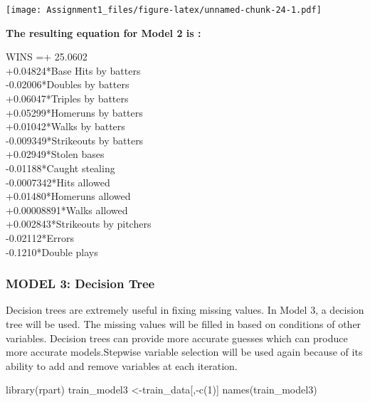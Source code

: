 \documentclass[
]{article}
\newenvironment{Shaded}{\begin{snugshade}}{\end{snugshade}}
\newcommand{\DecValTok}[1]{\textcolor[rgb]{0.00,0.00,0.81}{#1}}
\newcommand{\FunctionTok}[1]{\textcolor[rgb]{0.00,0.00,0.00}{#1}}
\newcommand{\NormalTok}[1]{#1}
\newcommand{\OtherTok}[1]{\textcolor[rgb]{0.56,0.35,0.01}{#1}}
\newcommand{\SpecialCharTok}[1]{\textcolor[rgb]{0.00,0.00,0.00}{#1}}
\begin{document}
\texttt{[image: Assignment1\_files/figure-latex/unnamed-chunk-24-1.pdf]}

\textbf{The resulting equation for Model 2 is :}

\begin{center}

WINS =+ 25.0602 \\
      +0.04824*Base Hits by batters \\
      -0.02006*Doubles by batters \\
      +0.06047*Triples by batters \\
      +0.05299*Homeruns by batters \\
      +0.01042*Walks by batters \\
      -0.009349*Strikeouts by batters \\
      +0.02949*Stolen bases \\
      -0.01188*Caught stealing \\
      -0.0007342*Hits allowed \\
      +0.01480*Homeruns allowed \\
      +0.00008891*Walks allowed \\
      +0.002843*Strikeouts by pitchers \\
      -0.02112*Errors \\
      -0.1210*Double plays \\
\end{center}

\hypertarget{model-3-decision-tree}{%
\subsubsection{MODEL 3: Decision Tree}\label{model-3-decision-tree}}

Decision trees are extremely useful in fixing missing values. In Model
3, a decision tree will be used. The missing values will be filled in
based on conditions of other variables. Decision trees can provide more
accurate guesses which can produce more accurate models.Stepwise
variable selection will be used again because of its ability to add and
remove variables at each iteration.

\begin{Shaded}
\begin{Highlighting}[]
\FunctionTok{library}\NormalTok{(rpart)}
\NormalTok{train\_model3 }\OtherTok{\textless{}{-}}\NormalTok{train\_data[,}\SpecialCharTok{{-}}\FunctionTok{c}\NormalTok{(}\DecValTok{1}\NormalTok{)]}
\FunctionTok{names}\NormalTok{(train\_model3)}
\end{Highlighting}
\end{Shaded}
\end{document}
